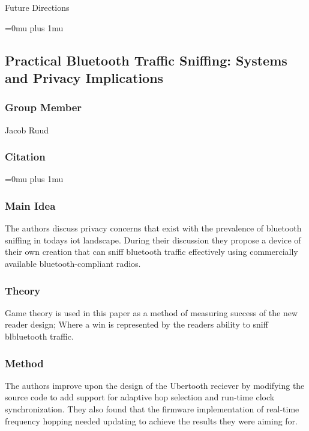 \noindent
Future Directions 

\Urlmuskip=0mu plus 1mu\relax

\noindent
\subsection{{P}ractical {B}luetooth {T}raffic {S}niffing: {S}ystems and {P}rivacy {I}mplications}

\subsubsection{Group Member}

\noindent
Jacob Ruud

\noindent
\subsubsection{Citation}

\Urlmuskip=0mu plus 1mu\relax

\subsubsection{Main Idea}

\noindent
The authors discuss privacy concerns that exist with the prevalence of bluetooth sniffing in todays iot landscape. During their discussion they propose a device of their own creation that can sniff bluetooth traffic effectively using commercially available bluetooth-compliant radios.

\subsubsection{Theory}

\noindent
Game theory is used in this paper as a method of measuring success of the new reader design; Where a win is represented by the readers ability to sniff blbluetooth traffic.

\subsubsection{Method}

\noindent
The authors improve upon the design of the Ubertooth reciever by modifying the source code to add support for adaptive hop selection and run-time clock synchronization. They also found that the firmware implementation of real-time frequency hopping needed updating to achieve the results they were aiming for.

